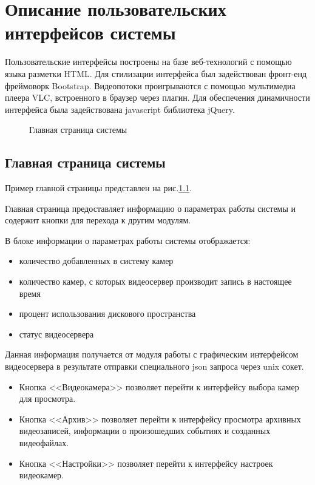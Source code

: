 \chapter{Описание пользовательских интерфейсов системы}
Пользовательские интерфейсы построены на базе веб-технологий с помощью языка разметки HTML.
Для стилизации интерфейса был задействован фронт-енд фреймоворк Bootstrap.
Видеопотоки проигрываются с помощью мультимедиа плеера VLC, встроенного в браузер через плагин.
Для обеспечения динамичности интерфейса была задействована javascript библиотека jQuery.

\begin{figure}[!htb]
\def\svgwidth{\columnwidth}
\caption{Главная страница системы}
\label{ui_1}
\end{figure}

\section{Главная страница системы}
Пример главной страницы представлен на рис.\ref{ui_1}.

Главная страница предоставляет информацию о параметрах работы системы и содержит
кнопки для перехода к другим модулям.

В блоке информации о параметрах работы системы отображается:
\smallskip
\begin{itemize}
\item количество добавленных в систему камер
\item количество камер, с которых видеосервер производит запись в настоящее время
\item процент использования дискового пространства
\item статус видеосервера
\end{itemize}

Данная информация получается от модуля работы с графическим интерфейсом видеосервера
в результате отправки специального json запроса через unix сокет.

\begin{itemize}
\item Кнопка <<Видеокамера>> позволяет перейти к интерфейсу выбора камер для просмотра.
\item Кнопка <<Архив>> позволяет перейти к интерфейсу просмотра архивных видеозаписей, информации
о произошедших событиях и созданных видеофайлах.
\item Кнопка <<Настройки>> позволяет перейти к интерфейсу настроек видеокамер.
\end{itemize}

